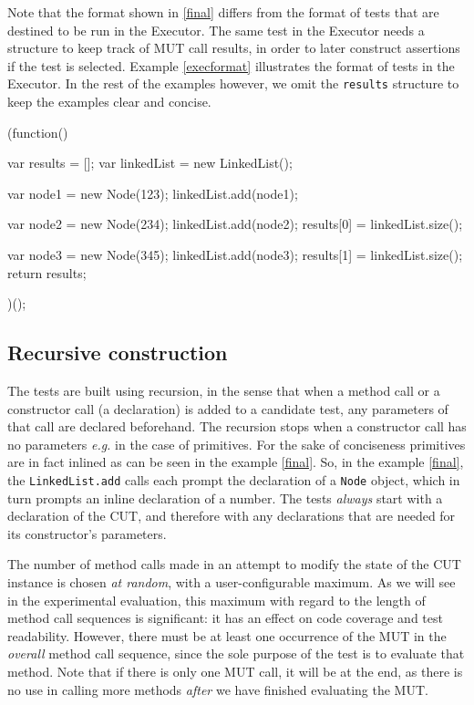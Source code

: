 Note that the format shown in \ref{final} differs from the format of tests that are destined to be run in the \textsf{Executor}. The same test in the \textsf{Executor} needs a structure to keep track of MUT call results, in order to later construct assertions if the test is selected. Example \ref{execformat} illustrates the format of tests in the \textsf{Executor}. In the rest of the examples however, we omit the \texttt{results} structure to keep the examples clear and concise.

% 
% 
\begin{code}[caption=Executor format,label=execformat]
(function() {
   var results = [];
   var linkedList = new LinkedList();

   var node1 = new Node(123);
   linkedList.add(node1);

   var node2 = new Node(234);
   linkedList.add(node2);
   results[0] = linkedList.size();

   var node3 = new Node(345);
   linkedList.add(node3);
   results[1] = linkedList.size();
   return results;
})();
\end{code}

\subsection{Recursive construction}

The tests are built using recursion, in the sense that when a method call or a constructor call (a declaration) is added to a candidate test, any parameters of that call are declared beforehand. The recursion stops when a constructor call has no parameters \emph{e.g.} in the case of primitives. For the sake of conciseness primitives are in fact inlined as can be seen in the example \ref{final}. So, in the example \ref{final}, the \texttt{LinkedList.add} calls each prompt the declaration of a \texttt{Node} object, which in turn prompts an inline declaration of a number.
The tests \emph{always} start with a declaration of the CUT, and therefore with any declarations that are needed for its constructor's parameters.

The number of method calls made in an attempt to modify the state of the CUT instance is chosen \emph{at random}, with a user-configurable maximum. As we will see in the experimental evaluation, this maximum with regard to the length of method call sequences is significant: it has an effect on code coverage and test readability. However, there must be at least one occurrence of the MUT in the \emph{overall} method call sequence, since the sole purpose of the test is to evaluate that method. Note that if there is only one MUT call, it will be at the end, as there is no use in calling more methods \emph{after} we have finished evaluating the MUT.

